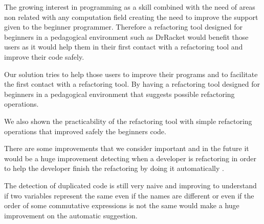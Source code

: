 The growing interest in programming as a skill combined with the need of areas
non related with any computation field creating the need to improve the support
given to the beginner programmer. %
Therefore a refactoring tool designed for beginners in a pedagogical environment such as DrRacket %
 would benefit those users as it would help them in their first contact with a
 refactoring tool and improve their code safely. %

Our solution tries to help those users to improve their programs and to facilitate
the first contact with a refactoring tool.
By having a refactoring tool designed for beginners in a pedagogical environment
that suggests possible refactoring operations.

We also shown the practicability of the refactoring tool with simple refactoring operations
that improved safely the beginners code.


There are some improvements that we consider important and in the future it would  %
be a huge improvement detecting when a developer is refactoring in order to help the developer finish the
refactoring by doing it automatically \cite{ge2012reconciling}.

The detection of duplicated code is still very naive and improving to understand if
two variables represent the same even if the names are different or even if the
 order of some commutative expressions is not the same would make a huge improvement
 on the automatic suggestion.

